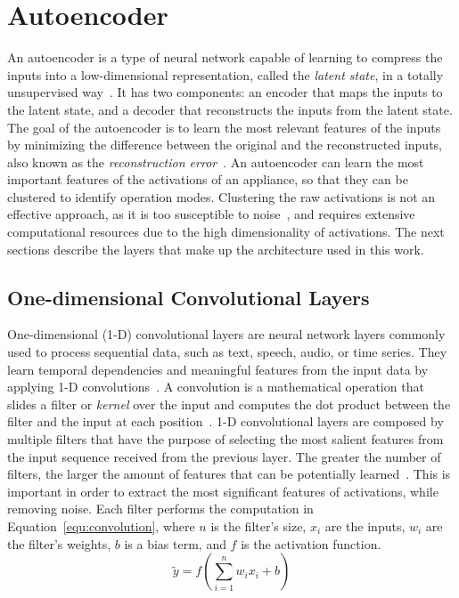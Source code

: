 \section{Autoencoder}

An autoencoder is a type of neural network capable of learning to compress the inputs into a low-dimensional representation, called the \textit{latent state}, in a totally unsupervised way~\parencite{hintonReducingDimensionalityData2006}. It has two components: an encoder that maps the inputs to the latent state, and a decoder that reconstructs the inputs from the latent state. The goal of the autoencoder is to learn the most relevant features of the inputs by minimizing the difference between the original and the reconstructed inputs, also known as the \textit{reconstruction error}~\parencite{hintonReducingDimensionalityData2006}. An autoencoder can learn the most important features of the activations of an appliance, so that they can be clustered to identify operation modes. Clustering the raw activations is not an effective approach, as it is too susceptible to noise~\parencite{castangiaClusteringApplianceOperation2023}, and requires extensive computational resources due to the high dimensionality of activations. The next sections describe the layers that make up the architecture used in this work.

\subsection{One-dimensional Convolutional Layers}

One-dimensional (1-D) convolutional layers are neural network layers commonly used to process sequential data, such as text, speech, audio, or time series. They learn temporal dependencies and meaningful features from the input data by applying 1-D convolutions~\parencite{kiranyaz1DConvolutionalNeural2021}. A convolution is a mathematical operation that slides a filter or \textit{kernel} over the input and computes the dot product between the filter and the input at each position~\parencite{rudinFunctionalAnalysisTata1973}. 1-D convolutional layers are composed by multiple filters that have the purpose of selecting the most salient features from the input sequence received from the previous layer. The greater the number of filters, the larger the amount of features that can be potentially learned~\parencite{castangiaClusteringApplianceOperation2023}. This is important in order to extract the most significant features of activations, while removing noise. Each filter performs the computation in Equation~\eqref{equ:convolution}, where $n$ is the filter's size, $x_i$ are the inputs, $w_i$ are the filter's weights, $b$ is a bias term, and $f$ is the activation function.
\begin{equation}\label{equ:convolution}
  \tilde{y} = f(\sum_{i=1}^{n}{w_i x_i} + b)
\end{equation}

